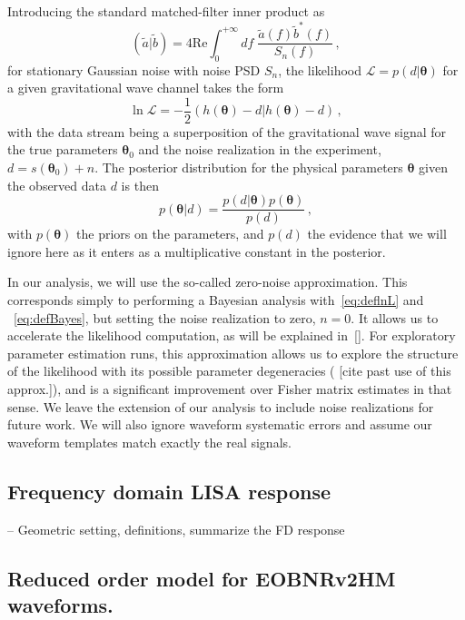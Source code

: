 \documentclass[aps,showpacs,twocolumn,prd,superscriptaddress,nofootinbib]{revtex4-1}
\newcommand{\be}{\begin{equation}}
\newcommand{\ee}{\end{equation}}
\newcommand\calL{{\mathcal{L}}}
\newcommand{\SM}[1]{{\color{Blue} #1}}
\begin{document}
Introducing the standard matched-filter inner product as
\be\label{eq:definnerproduct}
	( \tilde{a} | \tilde{b} ) = 4 \mathrm{Re} \int_{0}^{+\infty} df \; \frac{\tilde{a}(f) \tilde{b}^{*}(f)}{S_{n}(f)} \,,
\ee
for stationary Gaussian noise with noise PSD $S_{n}$, the likelihood $\calL = p(d | \bm{\theta})$ for a given gravitational wave channel takes the form
\be\label{eq:deflnL}
	\ln \calL = -\frac{1}{2} \left( h(\bm{\theta}) - d | h(\bm{\theta}) - d \right) \,,
\ee
with the data stream being a superposition of the gravitational wave signal for the true parameters $\bm{\theta}_{0}$ and the noise realization in the experiment, $d = s(\bm{\theta}_{0}) + n$. The posterior distribution for the physical parameters $\bm{\theta}$ given the observed data $d$ is then
\be\label{eq:defBayes}
	p\left( \bm{\theta} | d \right) = \frac{p(d | \bm{\theta})p(\bm{\theta})}{p(d)}\,,
\ee
with $p(\bm{\theta})$ the priors on the parameters, and $p(d)$ the evidence that we will ignore here as it enters as a multiplicative constant in the posterior.

In our analysis, we will use the so-called zero-noise approximation. This corresponds simply to performing a Bayesian analysis with~\eqref{eq:deflnL} and ~\eqref{eq:defBayes}, but setting the noise realization to zero, $n=0$. It allows us to accelerate the likelihood computation, as will be explained in~\ref{}. For exploratory parameter estimation runs, this approximation allows us to explore the structure of the likelihood with its possible parameter degeneracies (\SM{[cite past use of this approx.]}), and is a significant improvement over Fisher matrix estimates in that sense. We leave the extension of our analysis to include noise realizations for future work. We will also ignore waveform systematic errors and assume our waveform templates match exactly the real signals.


\subsection{Frequency domain LISA response}
\label{sec:response}

-- Geometric setting, definitions, summarize the FD response


\subsection{Reduced order model for EOBNRv2HM waveforms.}
\label{sec:waveforms}
\end{document}
